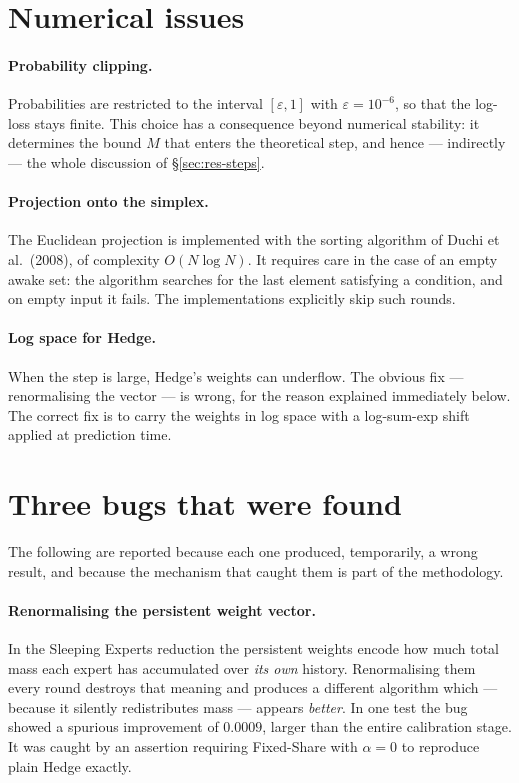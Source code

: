 \documentclass[12pt,a4paper,oneside]{report}
\renewcommand{\_}{\oldunderscore\allowbreak}
\theoremstyle{definition}
\theoremstyle{plain}
\theoremstyle{remark}
\begin{document}
\section{Numerical issues}

\paragraph{Probability clipping.} Probabilities are restricted to the interval
$[\varepsilon, 1]$ with $\varepsilon = 10^{-6}$, so that the log-loss stays finite. This choice
has a consequence beyond numerical stability: it determines the bound $M$ that enters the
theoretical step, and hence --- indirectly --- the whole discussion of \S\ref{sec:res-steps}.

\paragraph{Projection onto the simplex.} The Euclidean projection is implemented with the sorting
algorithm of Duchi et al.\ (2008), of complexity $O(N\log N)$. It requires care in the case of an
empty awake set: the algorithm searches for the last element satisfying a condition, and on empty
input it fails. The implementations explicitly skip such rounds.

\paragraph{Log space for Hedge.} When the step is large, Hedge's weights can underflow. The
obvious fix --- renormalising the vector --- is wrong, for the reason explained immediately
below. The correct fix is to carry the weights in log space with a log-sum-exp shift applied at
prediction time.

\section{Three bugs that were found}
\label{sec:impl-bugs}

The following are reported because each one produced, temporarily, a wrong result, and because
the mechanism that caught them is part of the methodology.

\paragraph{Renormalising the persistent weight vector.} In the Sleeping Experts reduction the
persistent weights encode how much total mass each expert has accumulated over \emph{its own}
history. Renormalising them every round destroys that meaning and produces a different algorithm
which --- because it silently redistributes mass --- appears \emph{better}. In one test the bug
showed a spurious improvement of $0.0009$, larger than the entire calibration stage. It was
caught by an assertion requiring Fixed-Share with $\alpha=0$ to reproduce plain Hedge exactly.
\end{document}
